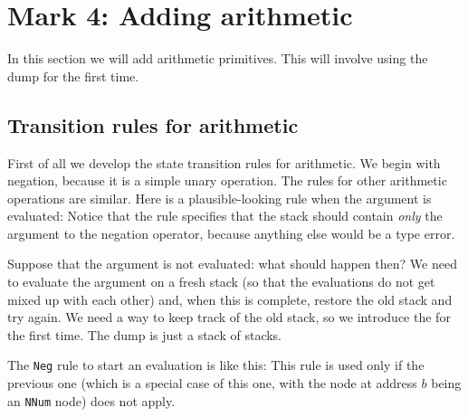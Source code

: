 \section{Mark 4: Adding arithmetic}
\label{sect:templ:primitives}

In this section we will add arithmetic primitives.
This will involve using the dump for the first time.

\subsection{Transition rules for arithmetic}
\label{sect:templ:arithmetic}

First of all we develop the state transition rules for
arithmetic.
We begin with negation, because it is a simple unary operation.
The rules for other arithmetic operations are similar.
Here is a plausible-looking rule when the argument is evaluated:
\label{rule:negate}
Notice that the rule specifies that the stack should contain {\em only\/}
the argument to the negation operator,
because anything else would be a type error.

Suppose that the argument is not evaluated: what should happen then?
We need to evaluate the argument on a fresh stack (so that the evaluations
do not get mixed up with each other) and,
when this is complete, restore the old stack and try again.
We need a way to keep track of the old stack, so we introduce the
 for the first time.
The dump is just a stack of stacks.

The \mbox{\tt Neg} rule to start an evaluation is like this:
\label{rule:negate-eval}
This rule is used only if the previous one (which is a special case of
this one, with the node at address $b$ being an \mbox{\tt NNum} node) does not apply.

